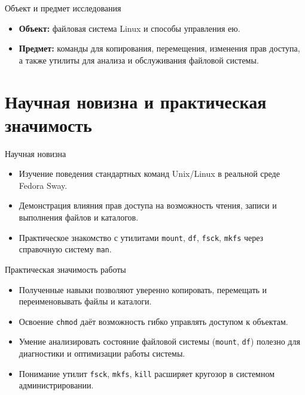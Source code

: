 \documentclass[
  ignorenonframetext,
  aspectratio=169,
  russian,
  aspectratio=169]{beamer}
\providecommand{\tightlist}{%
  \setlength{\itemsep}{0pt}\setlength{\parskip}{0pt}}
\begin{document}
\begin{frame}{Объект и предмет исследования}
\protect{}\label{ux43eux431ux44aux435ux43aux442-ux438-ux43fux440ux435ux434ux43cux435ux442-ux438ux441ux441ux43bux435ux434ux43eux432ux430ux43dux438ux44f}
\begin{itemize}[<+->]
\tightlist
\item
  \textbf{Объект:} файловая система Linux и способы управления ею.
\item
  \textbf{Предмет:} команды для копирования, перемещения, изменения прав
  доступа, а также утилиты для анализа и обслуживания файловой системы.
\end{itemize}
\end{frame}

\section{Научная новизна и практическая
значимость}\label{ux43dux430ux443ux447ux43dux430ux44f-ux43dux43eux432ux438ux437ux43dux430-ux438-ux43fux440ux430ux43aux442ux438ux447ux435ux441ux43aux430ux44f-ux437ux43dux430ux447ux438ux43cux43eux441ux442ux44c}

\begin{frame}[fragile]{Научная новизна}
\protect{}\label{ux43dux430ux443ux447ux43dux430ux44f-ux43dux43eux432ux438ux437ux43dux430}
\begin{itemize}[<+->]
\tightlist
\item
  Изучение поведения стандартных команд Unix/Linux в реальной среде
  Fedora Sway.
\item
  Демонстрация влияния прав доступа на возможность чтения, записи и
  выполнения файлов и каталогов.
\item
  Практическое знакомство с утилитами \texttt{mount}, \texttt{df},
  \texttt{fsck}, \texttt{mkfs} через справочную систему \texttt{man}.
\end{itemize}
\end{frame}

\begin{frame}[fragile]{Практическая значимость работы}
\protect{}\label{ux43fux440ux430ux43aux442ux438ux447ux435ux441ux43aux430ux44f-ux437ux43dux430ux447ux438ux43cux43eux441ux442ux44c-ux440ux430ux431ux43eux442ux44b}
\begin{itemize}[<+->]
\tightlist
\item
  Полученные навыки позволяют уверенно копировать, перемещать и
  переименовывать файлы и каталоги.
\item
  Освоение \texttt{chmod} даёт возможность гибко управлять доступом к
  объектам.
\item
  Умение анализировать состояние файловой системы (\texttt{mount},
  \texttt{df}) полезно для диагностики и оптимизации работы системы.
\item
  Понимание утилит \texttt{fsck}, \texttt{mkfs}, \texttt{kill} расширяет
  кругозор в системном администрировании.
\end{itemize}
\end{frame}
\end{document}

